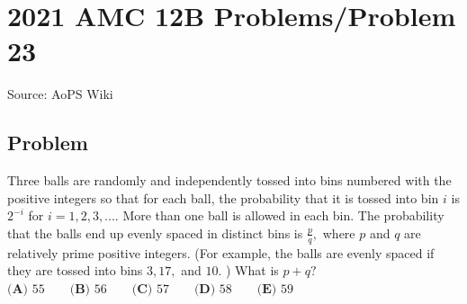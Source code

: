 \documentclass[12pt]{article}
\begin{document}
\section*{{2021 AMC 12B Problems/Problem 23}}
Source: AoPS Wiki

\subsection*{Problem}
Three balls are randomly and independently tossed into bins numbered with the positive integers so that for each ball, the probability that it is tossed into bin $i$ is $2^{-i}$ for $i=1,2,3,....$ More than one ball is allowed in each bin. The probability that the balls end up evenly spaced in distinct bins is $\frac pq,$ where $p$ and $q$ are relatively prime positive integers. (For example, the balls are evenly spaced if they are tossed into bins $3,17,$ and $10.$ ) What is $p+q?$ $\textbf{(A) }55 \qquad \textbf{(B) }56 \qquad \textbf{(C) }57\qquad \textbf{(D) }58 \qquad \textbf{(E) }59$
\end{document}

